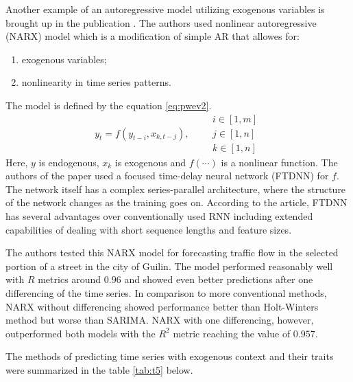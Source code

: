 \documentclass[3p,times,procedia]{elsarticle}
\begin{document}
Another example of an autoregressive model utilizing exogenous variables is brought up in the publication \cite{li2022nonlinear}. The authors used nonlinear autoregressive (NARX) model which is a modification of simple AR that allowes for:
\begin{enumerate}
	\item exogenous variables;
	\item nonlinearity in time series patterns.
\end{enumerate}
The model is defined by the equation \ref{eq:pwev2}.
\begin{equation} \label{eq:pwev2}
y_t = f(y_{t-i}, x_{k, t-j}), \qquad \begin{matrix}i \in [1, m] \\ j \in [1, n] \\ k \in [1, n] \end{matrix}
\end{equation}
Here, $y$ is endogenous, $x_k$ is exogenous and $f(\cdots)$ is a nonlinear function. The authors of the paper used a focused time-delay neural network (FTDNN) for $f$. The network itself has a complex series-parallel architecture, where the structure of the network changes as the training goes on. According to the article, FTDNN has several advantages over conventionally used RNN including extended capabilities of dealing with short sequence lengths and feature sizes.

The authors tested this NARX model for forecasting traffic flow in the selected portion of a street in the city of Guilin. The model performed reasonably well with $R$ metrics around $0.96$ and showed even better predictions after one differencing of the time series. In comparison to more conventional methods, NARX without differencing showed performance better than Holt-Winters method but worse than SARIMA. NARX with one differencing, however, outperformed both models with the $R^2$ metric reaching the value of $0.957$.

The methods of predicting time series with exogenous context and their traits were summarized in the table \ref{tab:t5} below.
\end{document}
